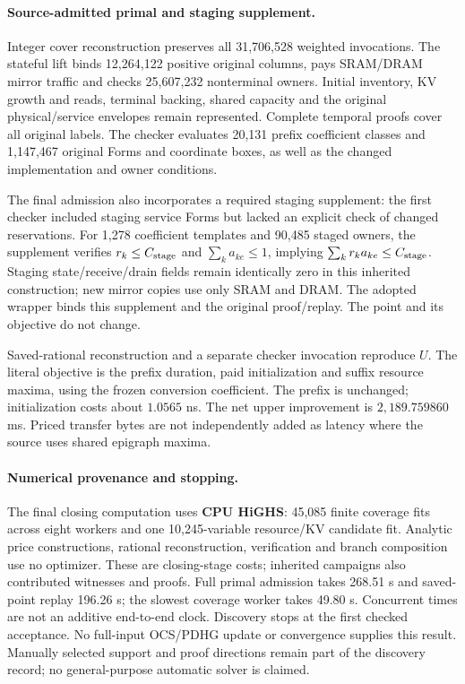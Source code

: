 \paragraph{Source-admitted primal and staging supplement.}
Integer cover reconstruction preserves all 31,706,528 weighted invocations.
The stateful lift binds 12,264,122 positive original columns, pays SRAM/DRAM
mirror traffic and checks 25,607,232 nonterminal owners. Initial inventory,
KV growth and reads, terminal backing, shared capacity and the original
physical/service envelopes remain represented. Complete temporal proofs cover
all original labels. The checker evaluates 20,131 prefix coefficient classes
and 1,147,467 original Forms and coordinate boxes, as well as the changed
implementation and owner conditions.

The final admission also incorporates a required staging supplement: the first
checker included staging service Forms but lacked an explicit check of changed
reservations. For 1,278 coefficient templates and 90,485 staged owners, the
supplement verifies $r_k\le C_{\rm stage}$ and $\sum_k a_{ke}\le1$, implying
$\sum_k r_k a_{ke}\le C_{\rm stage}$. Staging state/receive/drain fields remain
identically zero in this inherited construction; new mirror copies use only
SRAM and DRAM. The adopted wrapper binds this supplement and the original
proof/replay. The point and its objective do not change.

Saved-rational reconstruction and a separate checker invocation reproduce
$U$. The literal objective is the prefix duration, paid initialization and
suffix resource maxima, using the frozen conversion coefficient. The prefix
is unchanged; initialization costs about $1.0565$ ns. The net upper improvement
is $2{,}189.759860$ ms. Priced transfer bytes are not independently added as
latency where the source uses shared epigraph maxima.

\paragraph{Numerical provenance and stopping.}
The final closing computation uses \textbf{CPU HiGHS}: 45,085 finite coverage
fits across eight workers and one 10,245-variable resource/KV candidate fit.
Analytic price constructions, rational reconstruction, verification and branch
composition use no optimizer. These are closing-stage costs; inherited
campaigns also contributed witnesses and proofs. Full primal admission takes
268.51 s and saved-point replay 196.26 s; the slowest coverage worker takes
49.80 s. Concurrent times are not an additive end-to-end clock.
Discovery stops at the first checked acceptance. No full-input OCS/PDHG update
or convergence supplies this result. Manually selected support and proof
directions remain part of the discovery record; no general-purpose automatic
solver is claimed.

